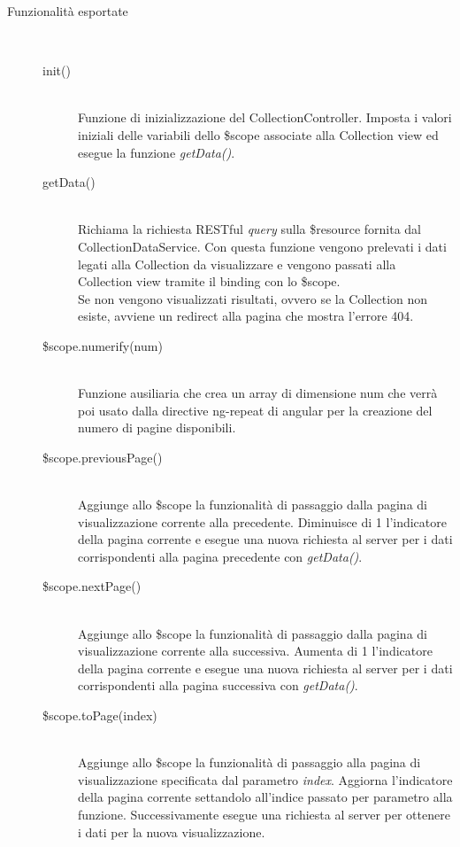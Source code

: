 \begin{description}
 \item[Funzionalità esportate] \hfill \\
 \begin{description}
  \item[init()] \hfill \\
  Funzione di inizializzazione del CollectionController. Imposta i valori iniziali delle variabili dello
  \$scope associate alla Collection view ed esegue la funzione \emph{getData()}.
  
  \item[getData()] \hfill \\
  Richiama la richiesta RESTful \textit{query} sulla \$resource fornita dal CollectionDataService.
  Con questa funzione vengono prelevati i dati legati alla Collection da visualizzare e vengono
  passati alla Collection view tramite il binding con lo \$scope. \\
  Se non vengono visualizzati risultati, ovvero se la Collection non esiste, avviene un redirect alla pagina
  che mostra l'errore 404.
  
  \item[\$scope.numerify(num)] \hfill \\
  Funzione ausiliaria che crea un array di dimensione   {num} che verrà poi usato dalla directive   {ng-repeat} di angular per la creazione 
  del numero di 
  pagine disponibili.
  
  \item[\$scope.previousPage()] \hfill \\
  Aggiunge allo \$scope la funzionalità di passaggio dalla pagina di visualizzazione corrente alla precedente.
  Diminuisce di 1 l'indicatore della pagina corrente e esegue una nuova richiesta al server per i dati corrispondenti
  alla pagina precedente con \emph{getData()}.
  
  \item[\$scope.nextPage()] \hfill \\
  Aggiunge allo \$scope la funzionalità di passaggio dalla pagina di visualizzazione corrente alla successiva.
  Aumenta di 1 l'indicatore della pagina corrente e esegue una nuova richiesta al server per i dati corrispondenti
  alla pagina successiva con \emph{getData()}.
  
  \item[\$scope.toPage(index)] \hfill \\
  Aggiunge allo \$scope la funzionalità di passaggio alla pagina di visualizzazione specificata dal parametro \emph{index}.
  Aggiorna l'indicatore della pagina corrente settandolo all'indice passato per parametro alla funzione.
  Successivamente esegue una richiesta al server per ottenere i dati per la nuova visualizzazione.
  

\end{description}
\end{description}
